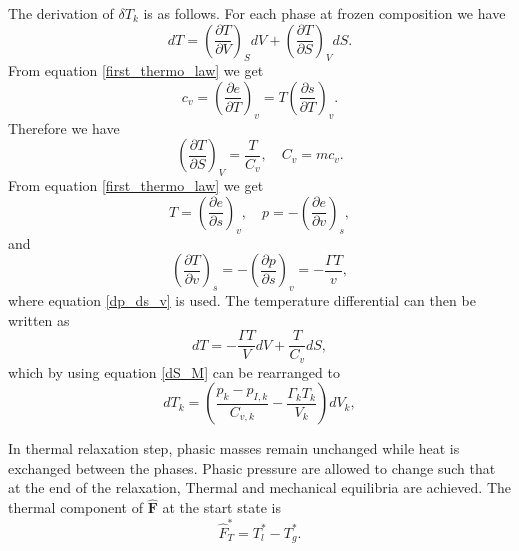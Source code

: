 The derivation of $\delta T_k$ is as follows. For each phase at frozen composition we have
\begin{equation}
dT = \left(\frac{\partial T}{\partial V}\right)_{S} dV + \left(\frac{\partial T}{\partial S}\right)_{V} dS.
\end{equation}
From equation \eqref{first_thermo_law} we get
\begin{equation}
c_v = \left(\frac{\partial e}{\partial T}\right)_{v} = T \left(\frac{\partial s}{\partial T}\right)_{v}.
\end{equation}
Therefore we have
\begin{equation}
\left(\frac{\partial T}{\partial S}\right)_{V} = \frac{T}{C_v}, \quad C_v=mc_v.
\end{equation}
From equation \eqref{first_thermo_law} we get
\begin{equation}
T = \left(\frac{\partial e}{\partial s}\right)_{v}, \quad p = - \left(\frac{\partial e}{\partial v}\right)_{s},
\end{equation}
and
\begin{equation}
\left(\frac{\partial T}{\partial v}\right)_{s} = - \left(\frac{\partial p}{\partial s}\right)_{v} = - \frac{\Gamma T}{v},
\end{equation}
where equation \eqref{dp_ds_v} is used. The temperature differential can then be written as
\begin{equation}
dT = - \frac{\Gamma T}{V} dV + \frac{T}{C_v} dS,
\end{equation}
which by using equation \eqref{dS_M} can be rearranged to
\begin{equation}
dT_k = \left( \frac{p_k-p_{I,k}}{C_{v,k}} - \frac{\Gamma_k T_k}{V_k} \right) dV_k,
\end{equation}


In thermal relaxation step, phasic masses remain unchanged while heat is exchanged between the phases. Phasic pressure are allowed to change such that at the end of the relaxation, Thermal and mechanical equilibria are achieved. The thermal component of $\hat{\boldsymbol{F}}$ at the start state is
\begin{equation}
\hat{F}_T^* = T_l^* - T_g^* .
\end{equation}
